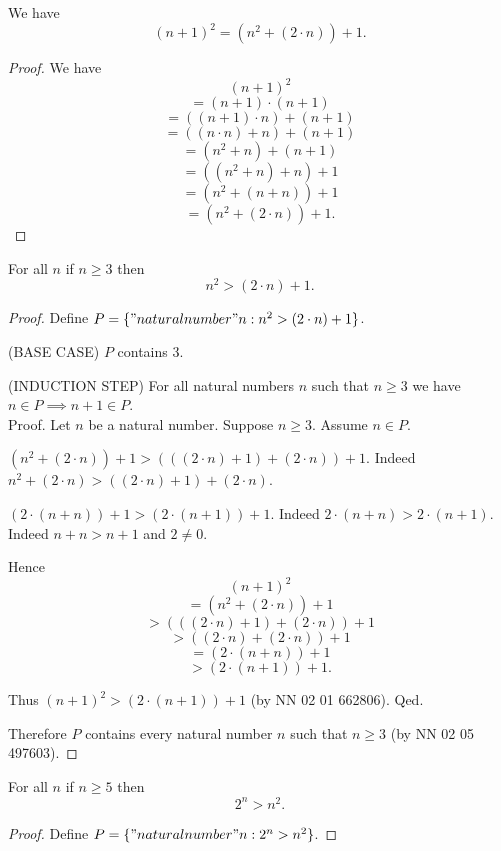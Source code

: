 \documentclass[../../natural-numbers.ftl.tex]{subfiles}
\begin{document}
  \begin{forthel}
    \begin{proposition}[NN 02 06 276270]
      We have
      $$(n + 1)^{2} = (n^{2} + (2 \cdot n)) + 1.$$
    \end{proposition}
    \begin{proof}
      We have
      $$  (n + 1)^{2}$$
      $$= (n + 1) \cdot (n + 1)$$
      $$= ((n + 1) \cdot n) + (n + 1)$$
      $$= ((n \cdot n) + n) + (n + 1)$$
      $$= (n^{2} + n) + (n + 1)$$
      $$= ((n^{2} + n) + n) + 1$$
      $$= (n^{2} + (n + n)) + 1$$
      $$= (n^{2} + (2 \cdot n)) + 1.$$
    \end{proof}


    \begin{proposition}[NN 02 06 671464]
      For all $n$ if $n \geq 3$ then
      $$n^{2} > (2 \cdot n) + 1.$$
    \end{proposition}
    \begin{proof}
      Define $P = \{ "natural number" n : n^{2} > (2 \cdot n) + 1 \}$.

      (BASE CASE) $P$ contains $3$.

      (INDUCTION STEP) For all natural numbers $n$ such that $n \geq 3$ we have $n \in P \implies n + 1 \in P$. \\
      Proof.
        Let $n$ be a natural number.
        Suppose $n \geq 3$.
        Assume $n \in P$.

        $(n^{2} + (2 \cdot n)) + 1 > (((2 \cdot n) + 1) + (2 \cdot n)) + 1$.
        Indeed $n^{2} + (2 \cdot n) > ((2 \cdot n) + 1) + (2 \cdot n)$.

        $(2 \cdot (n + n)) + 1 > (2 \cdot (n + 1)) + 1$.
        Indeed $2 \cdot (n + n) > 2 \cdot (n + 1)$.
        Indeed $n + n > n + 1$ and $2 \neq 0$.

        Hence
        $$  (n + 1)^{2}$$
        $$= (n^{2} + (2 \cdot n)) + 1$$
        $$> (((2 \cdot n) + 1) + (2 \cdot n)) + 1$$
        $$> ((2 \cdot n) + (2 \cdot n)) + 1$$
        $$= (2 \cdot (n + n)) + 1$$
        $$> (2 \cdot (n + 1)) + 1.$$

        Thus $(n + 1)^{2} > (2 \cdot (n + 1)) + 1$ (by NN 02 01 662806).
      Qed.

      Therefore $P$ contains every natural number $n$ such that $n \geq 3$ (by NN 02 05 497603).
    \end{proof}


    \begin{proposition}[NN 02 06 205395]
      For all $n$ if $n \geq 5$ then
      $$2^{n} > n^{2}.$$
    \end{proposition}
    \begin{proof}
      Define $P = \{ "natural number" n : 2^{n} > n^{2} \}$.


\end{proof}
\end{forthel}
\end{document}
